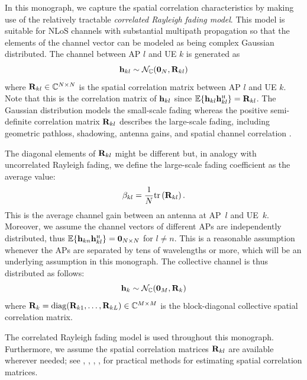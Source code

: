 In this monograph, we capture the spatial correlation characteristics by making use of the relatively tractable \emph{correlated Rayleigh fading model}. This model is suitable for NLoS channels with substantial multipath propagation so that the elements of the channel vector can be modeled as being complex Gaussian distributed. The channel between \gls{AP} $l$ and \gls{UE} $k$ is generated as
\begin{equation}
\mathbf{h}_{kl} \sim \mathcal{N}_{\mathbb{C}}( \mathbf{0}_N, \mathbf{R}_{kl})
\end{equation}
where $\mathbf{R}_{kl} \in \mathbb{C}^{N \times N}$ is the spatial correlation matrix between \gls{AP} $l$ and \gls{UE} $k$. Note that this is the correlation matrix of $\mathbf{h}_{kl}$ since $\mathbb{E} \{ \vect{h}_{kl} \vect{h}_{kl}^{\Htran} \} = \vect{R}_{kl}$.
The Gaussian distribution models the small-scale fading whereas the positive semi-definite correlation matrix $\mathbf{R}_{kl}$ describes the large-scale fading, including geometric pathloss, shadowing, antenna gains, and spatial channel correlation \cite[Sec.~2.2]{massivemimobook}. 

The diagonal elements of $\mathbf{R}_{kl}$ might be different but, in analogy with uncorrelated Rayleigh fading, we define the large-scale fading coefficient as the average value:
 \begin{equation} \label{eq:beta-definition-lk}
 \beta_{kl} = \frac{1}{N} \mathrm{tr} \left( \mathbf{R}_{kl} \right).
 \end{equation}
This is the average channel gain between an antenna at \gls{AP}~$l$ and \gls{UE}~$k$. Moreover, we assume the channel vectors of different APs are independently distributed, thus ${\mathbb{E}}\{\vect{h}_{kn} \vect{h}_{kl}^{\Htran}\} = {\bf 0}_{N\times N}$ for $l\ne n$. This is a reasonable assumption whenever the APs are separated by tens of wavelengths or more, which will be an underlying assumption in this monograph. 
The collective channel is thus distributed as follows:
\begin{equation}\label{eq:collective_channel}
\mathbf{h}_k \sim \mathcal{N}_{\mathbb{C}}(\mathbf{0}_M, \mathbf{R}_{k}) 
\end{equation}
where $\mathbf{R}_{k} = \mathrm{diag}(\mathbf{R}_{k1}, \ldots,  \mathbf{R}_{kL}) \in \mathbb{C}^{M \times M}$
is the block-diagonal collective spatial correlation matrix. 

The correlated Rayleigh fading model is used throughout this monograph.
Furthermore, we assume the spatial correlation matrices $\mathbf{R}_{kl}$ are available wherever needed; see \cite{BSD16A}, \cite{CaireC17a}, \cite{NeumannJU17}, \cite{Sanguinetti2019a}, \cite{UpadhyaJU17} for practical methods for estimating spatial correlation matrices.



